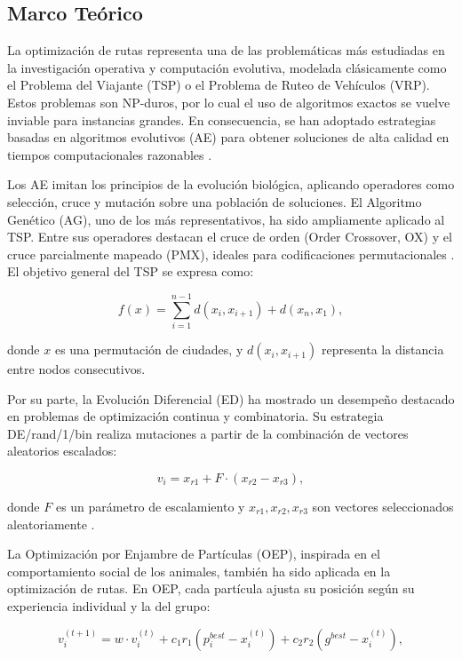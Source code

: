 \documentclass[10pt,a4paper]{article}
\begin{document}
\begin{multicols}{2}
\section{Marco Teórico}

La optimización de rutas representa una de las problemáticas más estudiadas en la investigación operativa y computación evolutiva, modelada clásicamente como el Problema del Viajante (TSP) o el Problema de Ruteo de Vehículos (VRP). Estos problemas son NP-duros, por lo cual el uso de algoritmos exactos se vuelve inviable para instancias grandes. En consecuencia, se han adoptado estrategias basadas en algoritmos evolutivos (AE) para obtener soluciones de alta calidad en tiempos computacionales razonables \cite{eiben2003}.

Los AE imitan los principios de la evolución biológica, aplicando operadores como selección, cruce y mutación sobre una población de soluciones. El Algoritmo Genético (AG), uno de los más representativos, ha sido ampliamente aplicado al TSP. Entre sus operadores destacan el cruce de orden (Order Crossover, OX) y el cruce parcialmente mapeado (PMX), ideales para codificaciones permutacionales \cite{syswerda1989}. El objetivo general del TSP se expresa como:

\begin{equation}
f(x) = \sum_{i=1}^{n-1} d(x_i, x_{i+1}) + d(x_n, x_1),
\end{equation}

donde $x$ es una permutación de ciudades, y $d(x_i, x_{i+1})$ representa la distancia entre nodos consecutivos.

Por su parte, la Evolución Diferencial (ED) ha mostrado un desempeño destacado en problemas de optimización continua y combinatoria. Su estrategia DE/rand/1/bin realiza mutaciones a partir de la combinación de vectores aleatorios escalados:

\begin{equation}
v_i = x_{r1} + F \cdot (x_{r2} - x_{r3}),
\end{equation}

donde $F$ es un parámetro de escalamiento y $x_{r1}, x_{r2}, x_{r3}$ son vectores seleccionados aleatoriamente \cite{das2011}.

La Optimización por Enjambre de Partículas (OEP), inspirada en el comportamiento social de los animales, también ha sido aplicada en la optimización de rutas. En OEP, cada partícula ajusta su posición según su experiencia individual y la del grupo:

\begin{equation}
v_i^{(t+1)} = w \cdot v_i^{(t)} + c_1 r_1 (p_i^{best} - x_i^{(t)}) + c_2 r_2 (g^{best} - x_i^{(t)}),
\end{equation}


\end{multicols}
\end{document}

